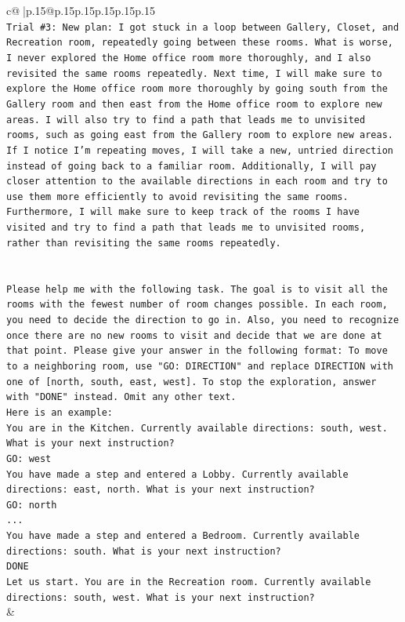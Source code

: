 \documentclass{article}
\begin{document}
{\begin{supertabular}{c@{$\;$}|p{.15\linewidth}@{}p{.15\linewidth}p{.15\linewidth}p{.15\linewidth}p{.15\linewidth}p{.15\linewidth}}
{{{\\ 
\texttt{Trial \#3: New plan: I got stuck in a loop between Gallery, Closet, and Recreation room, repeatedly going between these rooms. What is worse, I never explored the Home office room more thoroughly, and I also revisited the same rooms repeatedly. Next time, I will make sure to explore the Home office room more thoroughly by going south from the Gallery room and then east from the Home office room to explore new areas. I will also try to find a path that leads me to unvisited rooms, such as going east from the Gallery room to explore new areas. If I notice I'm repeating moves, I will take a new, untried direction instead of going back to a familiar room. Additionally, I will pay closer attention to the available directions in each room and try to use them more efficiently to avoid revisiting the same rooms. Furthermore, I will make sure to keep track of the rooms I have visited and try to find a path that leads me to unvisited rooms, rather than revisiting the same rooms repeatedly.} \\
\\ 
\\ 
\texttt{Please help me with the following task. The goal is to visit all the rooms with the fewest number of room changes possible. In each room, you need to decide the direction to go in. Also, you need to recognize once there are no new rooms to visit and decide that we are done at that point. Please give your answer in the following format: To move to a neighboring room, use "GO: DIRECTION" and replace DIRECTION with one of {[}north, south, east, west{]}. To stop the exploration, answer with "DONE" instead. Omit any other text.} \\
\texttt{Here is an example:} \\
\texttt{You are in the Kitchen. Currently available directions: south, west. What is your next instruction?} \\
\texttt{GO: west} \\
\texttt{You have made a step and entered a Lobby. Currently available directions: east, north. What is your next instruction?} \\
\texttt{GO: north} \\
\texttt{...} \\
\texttt{You have made a step and entered a Bedroom. Currently available directions: south. What is your next instruction?} \\
\texttt{DONE} \\
\texttt{Let us start. You are in the Recreation room. Currently available directions: south, west. What is your next instruction?} \\
            }
        }
    }
    & \\ \\


\end{supertabular}}
\end{document}
